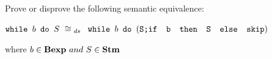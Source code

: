 \newcommand{\exNine}
{
	 $ \wbS{b}{S} ~\cong{}_{ds}~$
	 $
	 \wbS{b}{(
	 		\concat{S}{\ifABC{b}{S}{skip}}
	 	    )}
	 $
}

{
	Prove or disprove the following semantic equivalence:
	\begin{center}
		\exNine{}
	\end{center}
	where $b\in\mbox{\textbf{Bexp}}~and~S\in\mbox{\textbf{Stm}}$
}
{}
